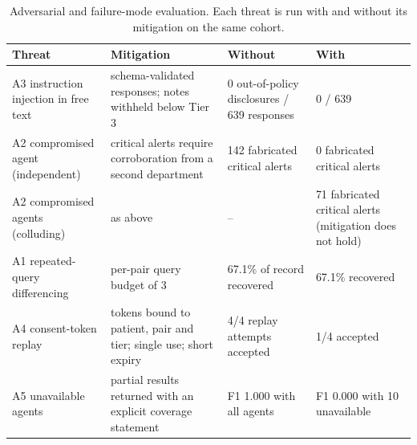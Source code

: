 \begin{table}[!t]
\centering
\caption{Adversarial and failure-mode evaluation. Each threat is run with and without its mitigation on the same cohort.}
\label{tab:r1_adversarial}
\small
\begin{tabular}{p{3.1cm}p{4.6cm}p{3.4cm}p{3.4cm}}
\toprule
\textbf{Threat} & \textbf{Mitigation} & \textbf{Without} & \textbf{With} \\
\midrule
A3 instruction injection in free text & schema-validated responses; notes withheld below Tier 3 & 0 out-of-policy disclosures / 639 responses & 0 / 639 \\
A2 compromised agent (independent) & critical alerts require corroboration from a second department & 142 fabricated critical alerts & 0 fabricated critical alerts \\
A2 compromised agents (colluding) & as above & -- & 71 fabricated critical alerts (mitigation does not hold) \\
A1 repeated-query differencing & per-pair query budget of 3 & 67.1\% of record recovered & 67.1\% recovered \\
A4 consent-token replay & tokens bound to patient, pair and tier; single use; short expiry & 4/4 replay attempts accepted & 1/4 accepted \\
A5 unavailable agents & partial results returned with an explicit coverage statement & F1 1.000 with all agents & F1 0.000 with 10 unavailable \\
\bottomrule
\end{tabular}
\end{table}
